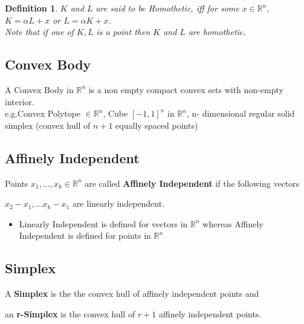 \documentclass[oneside]{book}
\newtheorem{mydef}{Definition}[section]
\begin{document}
	
	
	
	
	
	
	
	
	
	
	
	
	
	
	
	
	
	
	
	
	
	
	
	
	
	
	
	\begin{mydef} \label{d:1}
		$K$ and $L$ are said to be Homothetic, iff for some $x  \in \mathbb{R}^n,$ \\
		$K = \alpha L + x$ or $L=\alpha K+x $.\\
		Note that if one of $K,L $ is a point then $K $ and $L$ are homothetic.
	\end{mydef}
	
	
	
	
	
	\subsection{Convex Body}
	\label{ss:6}
	A Convex Body in  $\mathbb{R}^n$  is a non empty compact convex sets with non-empty interior.\\
	e.g.Convex Polytope $\in \mathbb{R}^n$, Cube $[-1,1]^{n}$  in $ \mathbb{R}^n$, n- dimensional regular solid simplex (convex hull of $n+1$ equally spaced points) 
	
	
	
	
	
	
	\subsection{Affinely Independent}
	\label{ss:7}
	Points $ x_1, \ldots ,x_k \in \mathbb{R}^n $ are called \textbf{Affinely Independent} if the following vectors \par
	$x_{2} - x_{1}, \ldots  x_{k} - x_{1} $ are linearly independent.
	
	\begin{itemize}
		\item Linearly Independent is defined for vectors in $\mathbb{R}^n $ whereas Affinely Independent is defined for points in $\mathbb{R}^n $
	\end{itemize}
	
	
	
	
	\subsection{Simplex} 
	\label{ss:8}
	A \textbf{Simplex} is the the convex hull of affinely independent points and \par 
	an \textbf{r-Simplex} is the convex hull of $r+ 1$ affinely independent points.
	
\end{document}
